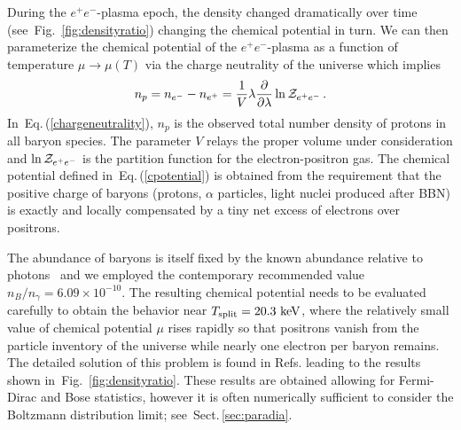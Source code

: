 \documentclass[aps,prd,floatfix,reprint]{revtex4-2}
\newcommand*{\keV}{\text{ keV}}
\newcommand{\req}[1]{Eq.\,(\ref{#1})}
\newcommand{\rf}[1]{Fig.~{\ref{#1}}}
\newcommand{\rsec}[1]{Sect.\,{\ref{#1}}}
\begin{document}
During the $e^{+}e^{-}$-plasma epoch, the density changed dramatically over time (see~\rf{fig:densityratio}) changing the chemical potential in turn. We can then parameterize the chemical potential of the $e^{+}e^{-}$-plasma as a function of temperature $\mu\rightarrow\mu(T)$ via the charge neutrality of the universe which implies
\begin{align}
 \label{chargeneutrality}
 n_{p}=n_{e^{-}}-n_{e^{+}}=\frac{1}{V}\lambda\frac{\partial}{\partial\lambda}\ln{\cal Z}_{e^{+}e^{-}}\,.
\end{align}
In~\req{chargeneutrality}, $n_{p}$ is the observed total number density of protons in all baryon species. The parameter $V$ relays the proper volume under consideration and $\ln{\cal Z}_{e^{+}e^{-}}$ is the partition function for the electron-positron gas. The chemical potential defined in~\req{cpotential} is obtained from the requirement that the positive charge of baryons (protons, $\alpha$ particles, light nuclei produced after BBN) is exactly and locally compensated by a tiny net excess of electrons over positrons.

The abundance of baryons is itself fixed by the known abundance relative to photons~\cite{ParticleDataGroup:2022pth} and we employed the contemporary recommended value $n_B/n_\gamma=6.09\times 10^{-10}$. The resulting chemical potential needs to be evaluated carefully to obtain the behavior near $T_{\rm split}=20.3\keV$, where the relatively small value of chemical potential $\mu$ rises rapidly so that positrons vanish from the particle inventory of the universe while nearly one electron per baryon remains. The detailed solution of this problem is found in Refs.\;\cite{Fromerth:2012fe,Rafelski:2023emw} leading to the results shown in~\rf{fig:densityratio}. These results are obtained allowing for Fermi-Dirac and Bose statistics, however it is often numerically sufficient to consider the Boltzmann distribution limit; see~\rsec{sec:paradia}.
\end{document}
